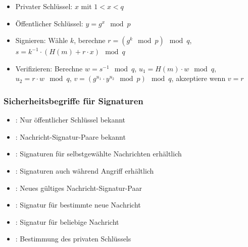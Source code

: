 \documentclass[
../../css_summary.tex,
]
{subfiles}
\begin{document}
\begin{defbox}
   \begin{itemize}
      \item Privater Schlüssel: $x$ mit $1 < x < q$
      \item Öffentlicher Schlüssel: $y = g^x \mod p$
      \item Signieren: Wähle $k$, berechne $r = (g^k \mod p) \mod q$, $s = k^{-1} \cdot (H(m) + r \cdot x) \mod q$
      \item Verifizieren: Berechne $w = s^{-1} \mod q$, $u_1 = H(m) \cdot w \mod q$, $u_2 = r \cdot w \mod q$, $v = (g^{u_1} \cdot y^{u_2} \mod p) \mod q$, akzeptiere wenn $v = r$
   \end{itemize}
\end{defbox}

\subsubsection{Sicherheitsbegriffe für Signaturen}

\begin{defbox}[Angreiferwissen]
   \begin{itemize}
      \item {}: Nur öffentlicher Schlüssel bekannt
      \item {}: Nachricht-Signatur-Paare bekannt
      \item {}: Signaturen für selbstgewählte Nachrichten erhältlich
      \item {}: Signaturen auch während Angriff erhältlich
   \end{itemize}
\end{defbox}

\begin{defbox}[Angreiferziele]
   \begin{itemize}
      \item {}: Neues gültiges Nachricht-Signatur-Paar
      \item {}: Signatur für bestimmte neue Nachricht
      \item {}: Signatur für beliebige Nachricht
      \item {}: Bestimmung des privaten Schlüssels
   \end{itemize}
\end{defbox}
\end{document}
